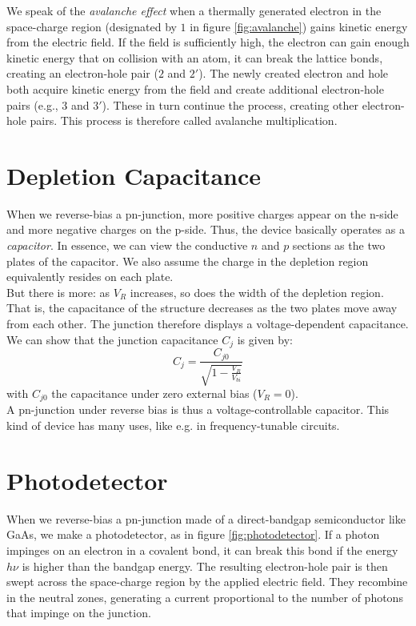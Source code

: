 We speak of the \emph{avalanche effect} when a thermally generated electron in the space-charge region (designated by $1$ in figure \ref{fig:avalanche}) gains kinetic energy from the electric field. If the field is sufficiently high, the electron can gain enough kinetic energy that on collision with an atom, it can break the lattice bonds, creating an electron-hole pair ($2$ and $2'$). The newly created electron and hole both acquire kinetic energy from the field and create additional electron-hole pairs (e.g., $3$ and $3'$). These in turn continue the process, creating other electron-hole pairs. This process is therefore called avalanche multiplication.

\section{Depletion Capacitance}
\label{sec:depletion_capacitance}
When we reverse-bias a pn-junction, more positive charges appear on the n-side and more negative charges on the p-side. Thus, the device basically operates as a \emph{capacitor}. In essence, we can view the conductive $n$ and $p$ sections as the two plates of the capacitor. We also assume the charge in the depletion region equivalently resides on each plate.\\
But there is more: as $V_R$ increases, so does the width of the depletion region. That is, the capacitance of the structure decreases as the two plates move away from each other. The junction therefore displays a voltage-dependent capacitance. We can show that the junction capacitance $C_j$ is given by:
\begin{equation}
	C_j = \frac{C_{j0}}{\sqrt{1 - \frac{V_R}{V_{bi}}}}
\end{equation}
with $C_{j0}$ the capacitance under zero external bias ($V_R = 0$).\\
A pn-junction under reverse bias is thus a voltage-controllable capacitor. This kind of device has many uses, like e.g. in frequency-tunable circuits.

\section{Photodetector}
When we reverse-bias a pn-junction made of a direct-bandgap semiconductor like GaAs, we make a photodetector, as in figure \ref{fig:photodetector}. If a photon impinges on an electron in a covalent bond, it can break this bond if the energy $h \nu$ is higher than the bandgap energy. The resulting electron-hole pair is then swept across the space-charge region by the applied electric field. They recombine in the neutral zones, generating a current proportional to the number of photons that impinge on the junction.

